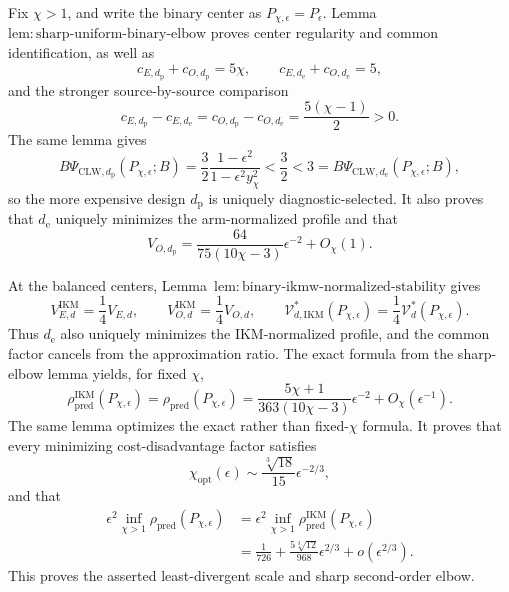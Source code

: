 Fix \(\chi>1\), and write the binary center as \(P_{\chi,\epsilon}=P_\epsilon\). Lemma~\(\mathrm{lem{:}sharp\text{-}uniform\text{-}binary\text{-}elbow}\) proves center regularity and common identification, as well as
\[
 c_{E,d_{\mathrm p}}+c_{O,d_{\mathrm p}}=5\chi,
 \qquad
 c_{E,d_{\mathrm e}}+c_{O,d_{\mathrm e}}=5,
\]
and the stronger source-by-source comparison
\[
 c_{E,d_{\mathrm p}}-c_{E,d_{\mathrm e}}
 =c_{O,d_{\mathrm p}}-c_{O,d_{\mathrm e}}
 =\frac{5(\chi-1)}2>0.                                \tag{1}
\]
The same lemma gives
\[
 B\Psi_{\mathrm{CLW},d_{\mathrm p}}(P_{\chi,\epsilon};B)
 =\frac32\frac{1-\epsilon^2}{1-\epsilon^2y_\chi^2}
 <\frac32<3
 =B\Psi_{\mathrm{CLW},d_{\mathrm e}}(P_{\chi,\epsilon};B), \tag{2}
\]
so the more expensive design \(d_{\mathrm p}\) is uniquely diagnostic-selected. It also proves that \(d_{\mathrm e}\) uniquely minimizes the arm-normalized profile and that
\[
 V_{O,d_{\mathrm p}}
 =\frac{64}{75(10\chi-3)}\epsilon^{-2}+O_\chi(1).      \tag{3}
\]

At the balanced centers, Lemma~\(\mathrm{lem{:}binary\text{-}ikmw\text{-}normalized\text{-}stability}\) gives
\[
 V_{E,d}^{\mathrm{IKM}}=\frac14V_{E,d},
 \qquad
 V_{O,d}^{\mathrm{IKM}}=\frac14V_{O,d},
 \qquad
 \mathcal V_{d,\mathrm{IKM}}^*(P_{\chi,\epsilon})
 =\frac14\mathcal V_d^*(P_{\chi,\epsilon}).           \tag{4}
\]
Thus \(d_{\mathrm e}\) also uniquely minimizes the IKM-normalized profile, and the common factor cancels from the approximation ratio. The exact formula from the sharp-elbow lemma yields, for fixed \(\chi\),
\[
 \rho_{\mathrm{pred}}^{\mathrm{IKM}}(P_{\chi,\epsilon})
 =\rho_{\mathrm{pred}}(P_{\chi,\epsilon})
 =\frac{5\chi+1}{363(10\chi-3)}\epsilon^{-2}
 +O_\chi(\epsilon^{-1}).                              \tag{5}
\]
The same lemma optimizes the exact rather than fixed-\(\chi\) formula. It proves that every minimizing cost-disadvantage factor satisfies
\[
 \chi_{\mathrm{opt}}(\epsilon)
 \sim \frac{\sqrt[3]{18}}{15}\epsilon^{-2/3},         \tag{6}
\]
and that
\[
\begin{aligned}
 \epsilon^2\inf_{\chi>1}\rho_{\mathrm{pred}}(P_{\chi,\epsilon})
 &=\epsilon^2\inf_{\chi>1}\rho_{\mathrm{pred}}^{\mathrm{IKM}}(P_{\chi,\epsilon})\\
 &=\frac1{726}+\frac{5\sqrt[3]{12}}{968}\epsilon^{2/3}
 +o(\epsilon^{2/3}).                                  \tag{7}
\end{aligned}
\]
This proves the asserted least-divergent scale and sharp second-order elbow.

